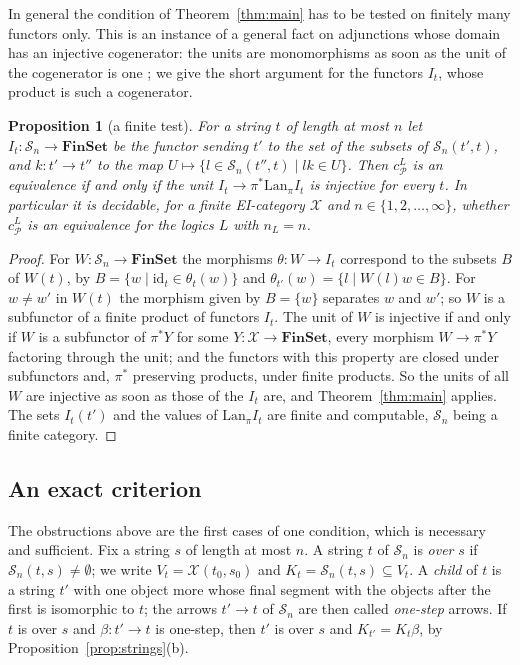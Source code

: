 \documentclass[11pt]{amsart}
\newtheorem{prop}[thm]{Proposition}
\theoremstyle{definition}
\newcommand{\Fin}{\mathbf{FinSet}}
\newcommand{\cX}{\mathcal X}
\newcommand{\cP}{\mathcal P}
\newcommand{\cS}{\mathcal S}
\newcommand{\id}{\mathrm{id}}
\begin{document}
In general the condition of Theorem~\ref{thm:main} has to be tested on
finitely many functors only. This is an instance of a general fact on
adjunctions whose domain has an injective cogenerator: the units are
monomorphisms as soon as the unit of the cogenerator is one
\cite[Prop.~2.5]{Mesablishvili}; we give the short argument for the
functors $I_t$, whose product is such a cogenerator.

\begin{prop}[a finite test]\label{prop:test}
For a string $t$ of length at most $n$ let $I_t\colon\cS_n\to\Fin$ be
the functor sending $t'$ to the set of the subsets of $\cS_n(t',t)$,
and $k\colon t'\to t''$ to the map $U\mapsto\{l\in\cS_n(t'',t)\mid
lk\in U\}$. Then $c^L_\cP$ is an equivalence if and only if the unit
$I_t\to\pi^*\mathrm{Lan}_\pi I_t$ is injective for every $t$. In
particular it is decidable, for a finite EI-category $\cX$ and $n\in
\{1,2,\dots,\infty\}$, whether $c^L_\cP$ is an equivalence for the
logics $L$ with $n_L=n$.
\end{prop}
\begin{proof}
For $W\colon\cS_n\to\Fin$ the morphisms $\theta\colon W\to I_t$
correspond to the subsets $B$ of $W(t)$, by $B=\{w\mid\id_t\in
\theta_t(w)\}$ and $\theta_{t'}(w)=\{l\mid W(l)w\in B\}$. For $w\ne w'$
in $W(t)$ the morphism given by $B=\{w\}$ separates $w$ and $w'$; so
$W$ is a subfunctor of a finite product of functors $I_t$. The unit of
$W$ is injective if and only if $W$ is a subfunctor of $\pi^*Y$ for
some $Y\colon\cX\to\Fin$, every morphism $W\to\pi^*Y$ factoring through
the unit; and the functors with this property are closed under
subfunctors and, $\pi^*$ preserving products, under finite products. So
the units of all $W$ are injective as soon as those of the $I_t$ are,
and Theorem~\ref{thm:main} applies. The sets $I_t(t')$ and the values
of $\mathrm{Lan}_\pi I_t$ are finite and computable, $\cS_n$ being a
finite category.
\end{proof}

\subsection*{An exact criterion}

The obstructions above are the first cases of one condition, which is
necessary and sufficient. Fix a string $s$ of length at most $n$. A
string $t$ of $\cS_n$ is \emph{over} $s$ if $\cS_n(t,s)\ne\emptyset$;
we write $V_t=\cX(t_0,s_0)$ and $K_t=\cS_n(t,s)\subseteq V_t$. A
\emph{child} of $t$ is a string $t'$ with one object more whose final
segment with the objects after the first is isomorphic to $t$; the
arrows $t'\to t$ of $\cS_n$ are then called \emph{one-step} arrows. If
$t$ is over $s$ and $\beta\colon t'\to t$ is one-step, then $t'$ is
over $s$ and $K_{t'}=K_t\beta$, by
Proposition~\ref{prop:strings}(b).
\end{document}
